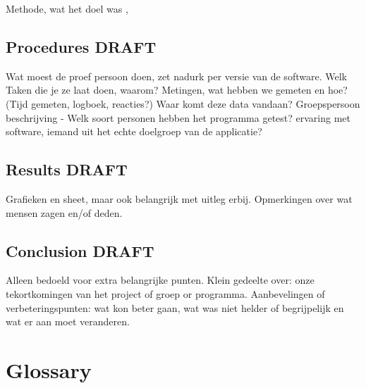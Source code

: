 \documentclass[11pt]{article}
\begin{document}
Methode, wat het doel was , 

 \subsection{Procedures DRAFT}
Wat moest de proef persoon doen, zet nadurk per versie van de software.
Welk Taken die je ze laat doen, waarom?
Metingen, wat hebben we gemeten en hoe? (Tijd gemeten, logboek, reacties?) 
Waar komt deze data vandaan?
Groepspersoon beschrijving - Welk soort personen hebben het programma getest?
	ervaring met software, iemand uit het echte doelgroep van de applicatie?

 \subsection{Results DRAFT}
Grafieken en sheet, maar ook belangrijk met uitleg erbij. 
Opmerkingen over wat mensen zagen en/of deden. 

 \subsection{Conclusion DRAFT}
Alleen bedoeld voor extra belangrijke punten.
Klein gedeelte over: onze tekortkomingen van het project of groep or programma.
Aanbevelingen of verbeteringspunten: wat kon beter gaan, wat was niet helder of begrijpelijk en wat er aan moet veranderen.

\newpage
\section{Glossary}
\printglossary[title=]
\end{document}
